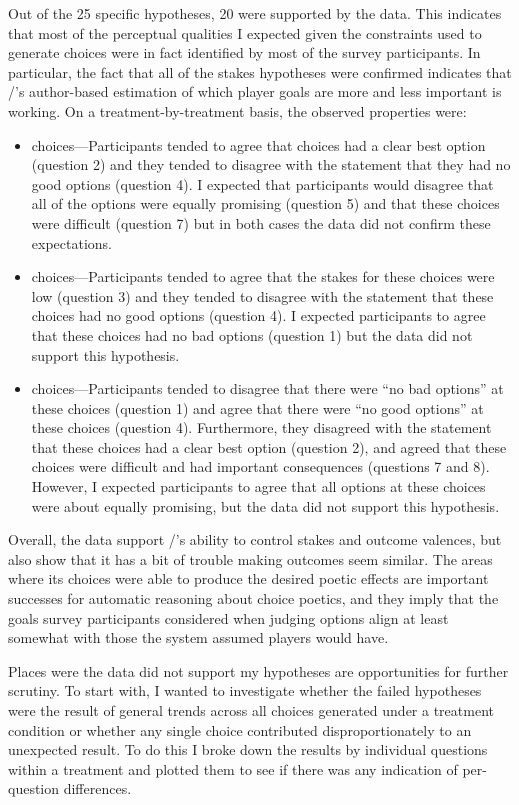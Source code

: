 Out of the 25 specific hypotheses, 20 were supported by the data.
%
This indicates that most of the perceptual qualities I expected given the constraints used to generate choices were in fact identified by most of the survey participants.
%
In particular, the fact that all of the stakes hypotheses were confirmed indicates that \dunyazad/'s author-based estimation of which player goals are more and less important is working.
%
On a treatment-by-treatment basis, the observed properties were:
%
\begin{itemize}
  \item \obv{} choices---Participants tended to agree that \obv{} choices had a clear best option (question 2) and they tended to disagree with the statement that they had no good options (question 4). I expected that participants would disagree that all of the options were equally promising (question 5) and that these choices were difficult (question 7) but in both cases the data did not confirm these expectations.
  \item \rlx{} choices---Participants tended to agree that the stakes for these choices were low (question 3) and they tended to disagree with the statement that these choices had no good options (question 4). I expected participants to agree that these choices had no bad options (question 1) but the data did not support this hypothesis.
  \item \dlm{} choices---Participants tended to disagree that there were ``no bad options'' at these choices (question 1) and agree that there were ``no good options'' at these choices (question 4). Furthermore, they disagreed with the statement that these choices had a clear best option (question 2), and agreed that these choices were difficult and had important consequences (questions 7 and 8). However, I expected participants to agree that all options at these choices were about equally promising, but the data did not support this hypothesis.
\end{itemize}
%
Overall, the data support \dunyazad/'s ability to control stakes and outcome valences, but also show that it has a bit of trouble making outcomes seem similar.
%
The areas where its choices were able to produce the desired poetic effects are important successes for automatic reasoning about choice poetics, and they imply that the goals survey participants considered when judging options align at least somewhat with those the system assumed players would have.


Places were the data did not support my hypotheses are opportunities for further scrutiny.
%
To start with, I wanted to investigate whether the failed hypotheses were the result of general trends across all choices generated under a treatment condition or whether any single choice contributed disproportionately to an unexpected result.
%
To do this I broke down the results by individual questions within a treatment and plotted them to see if there was any indication of per-question differences.


